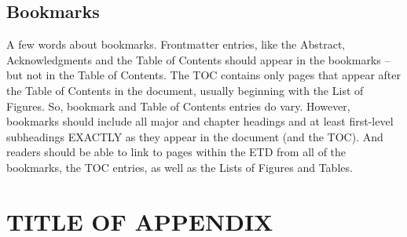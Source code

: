 \documentclass{UCF_ETD}
\begin{document}
\section{Bookmarks}
A few words about bookmarks. Frontmatter entries, like the Abstract, Acknowledgments and the Table of Contents should appear in the bookmarks – but not in the Table of Contents. The TOC contains only pages that appear after the Table of Contents in the document, usually beginning with the List of Figures. So, bookmark and Table of Contents entries do vary.
However, bookmarks should include all major and chapter headings and at least first-level subheadings EXACTLY as they appear in the document (and the TOC). And readers should be able to link to pages within the ETD from all of the bookmarks, the TOC entries, as well as the Lists of Figures and Tables.

\appendix

\chapter{TITLE OF APPENDIX}
\newpage





\noindent{}\\
\\
\\
\\
\\
\\
\end{document}

